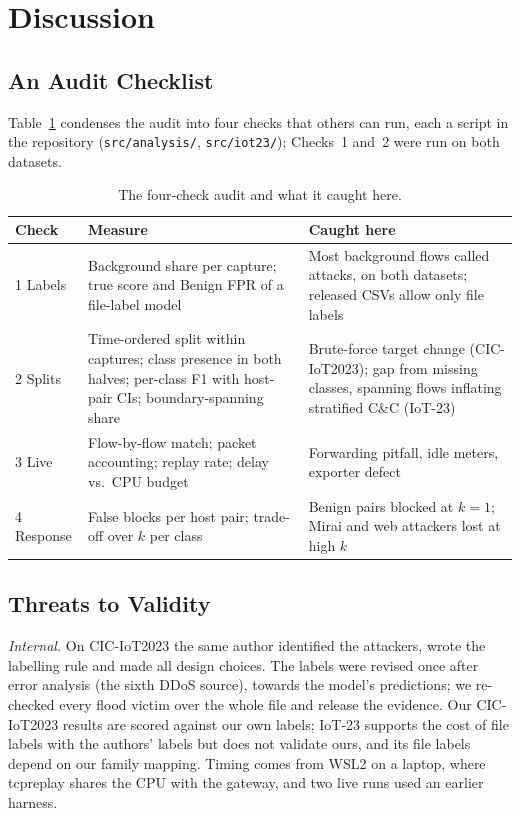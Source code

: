 \section{Discussion}\label{sec:discussion}

\subsection{An Audit Checklist}\label{sec:checklist}

Table~\ref{tab:checklist} condenses the audit into four checks that others can run, each a script in the repository (\nolinkurl{src/analysis/}, \nolinkurl{src/iot23/}); Checks~1 and~2 were run on both datasets.

\begin{table}[t]
\centering
\caption{The four-check audit and what it caught here.}
\label{tab:checklist}
\footnotesize
\setlength{\tabcolsep}{3pt}
\begin{tabular}{p{1.0cm}p{3.5cm}p{3.6cm}}
\hline
Check & Measure & Caught here \\
\hline
1 Labels & Background share per capture; true score and Benign FPR of a file-label model & Most background flows called attacks, on both datasets; released CSVs allow only file labels \\
2 Splits & Time-ordered split within captures; class presence in both halves; per-class F1 with host-pair CIs; boundary-spanning share & Brute-force target change (CIC-IoT2023); gap from missing classes, spanning flows inflating stratified C\&C (IoT-23) \\
3 Live & Flow-by-flow match; packet accounting; replay rate; delay vs.\ CPU budget & Forwarding pitfall, idle meters, exporter defect \\
4 Response & False blocks per host pair; trade-off over $k$ per class & Benign pairs blocked at $k=1$; Mirai and web attackers lost at high $k$ \\
\hline
\end{tabular}
\end{table}

\subsection{Threats to Validity}\label{sec:threats}

\emph{Internal.} On CIC-IoT2023 the same author identified the attackers, wrote the labelling rule and made all design choices. The labels were revised once after error analysis (the sixth DDoS source), towards the model's predictions; we re-checked every flood victim over the whole file and release the evidence. Our CIC-IoT2023 results are scored against our own labels; IoT-23 supports the cost of file labels with the authors' labels but does not validate ours, and its file labels depend on our family mapping. Timing comes from WSL2 on a laptop, where tcpreplay shares the CPU with the gateway, and two live runs used an earlier harness.

